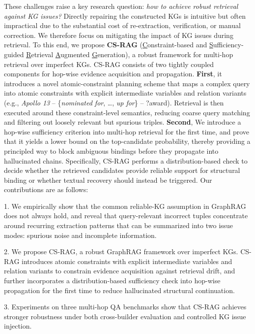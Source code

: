 \documentclass{article}
\theoremstyle{plain}
\theoremstyle{definition}
\theoremstyle{remark}
\begin{document}
These challenges raise a key research question: \textit{how to achieve robust retrieval against KG issues?} Directly repairing the constructed KGs is intuitive but often impractical due to the substantial cost of re-extraction, verification, or manual correction. We therefore focus on mitigating the impact of KG issues during retrieval. To this end, we propose \textbf{CS-RAG} (\underline{C}onstraint-based and \underline{S}ufficiency-guided \underline{R}etrieval \underline{A}ugmented \underline{G}eneration), a robust framework for multi-hop retrieval over imperfect KGs. CS-RAG consists of two tightly coupled components for hop-wise evidence acquisition and propagation. \textbf{First}, it introduces a novel atomic-constraint planning scheme that maps a complex query into atomic constraints with explicit intermediate variables and relation variants (e.g., \textit{Apollo 13} -- \{\textit{nominated for}, \ldots, \textit{up for}\} -- ?award). Retrieval is then executed around these constraint-level semantics, reducing coarse query matching and filtering out loosely relevant but spurious triples. \textbf{Second}, We introduce a hop-wise sufficiency criterion into multi-hop retrieval for the first time, and prove that it yields a lower bound on the top-candidate probability, thereby providing a principled way to block ambiguous bindings before they propagate into hallucinated chains. Specifically, CS-RAG performs a distribution-based check to decide whether the retrieved candidates provide reliable support for structural binding or whether textual recovery should instead be triggered. Our contributions are as follows:

1. We empirically show that the common reliable-KG assumption in GraphRAG does not always hold, and reveal that query-relevant incorrect tuples concentrate around recurring extraction patterns that can be summarized into two issue modes: spurious noise and incomplete information.

2. We propose CS-RAG, a robust GraphRAG framework over imperfect KGs. CS-RAG introduces atomic constraints with explicit intermediate variables and relation variants to constrain evidence acquisition against retrieval drift, and further incorporates a distribution-based sufficiency check into hop-wise propagation for the first time to reduce hallucinated structural continuation.

3. Experiments on three multi-hop QA benchmarks show that CS-RAG achieves stronger robustness under both cross-builder evaluation and controlled KG issue injection.
\end{document}
